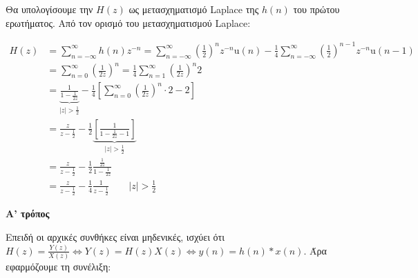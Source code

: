 \documentclass[11pt,a4paper,notitlepage,fleqn,draft]{article}
\begin{document}
\begin{exercise}
\begin{enumpar}
	\item
	

	Θα υπολογίσουμε την \( H(z) \) ως μετασχηματισμό Laplace της \( h(n) \) του πρώτου ερωτήματος.
	Από τον ορισμό του μετασχηματισμού Laplace:
	
	\begin{align*}
		H(z) &= \sum_{n=-\infty}^{\infty} h(n)z^{-n} = \sum_{n=-\infty}^{\infty}\left(\frac{1}{2}\right)^n z^{-n}\mathrm{u}(n)
		-\frac{1}{4}\sum_{n=-\infty}^{\infty}\left(\frac{1}{2}\right)^{n-1}z^{-n}\mathrm{u}(n-1)
		\\ &= \sum_{n=0}^{\infty} \left(\frac{1}{2z}\right)^n = \frac{1}{4}\sum_{n=1}^{\infty}\left(\frac{1}{2z}\right)^n 2
		\\ &= \underbrace{\frac{1}{1-\frac{1}{2z}}}_{|z|>\frac{1}{2}}
		- \frac{1}{4}\left[\sum_{n=0}^{\infty} \left(\frac{1}{2z}\right)^n \cdot 2 - 2 \right]
		\\ &= \frac{z}{z-\frac{1}{2}}-\frac{1}{2}\underbrace{\left[
		\frac{1}{1-\frac{1}{2z}-1}
		\right]}_{|z|>\frac{1}{2}}
        \\ &= \frac{z}{z-\frac{1}{2}} -\frac{1}{2}\frac{\frac{1}{2z}}{1-\frac{1}{2z}}
        \\ &
        =\frac{z}{z-\frac{1}{2}} - \frac{1}{4}\frac{1}{z-\frac{1}{2}}\qquad |z|>\frac{1}{2}
	\end{align*}
	
    \item
	\begin{enumgreekpar}
	\item \textbf{Α' τρόπος}
	
	
	Επειδή οι αρχικές συνθήκες είναι μηδενικές, ισχύει ότι \( H(z) = \frac{Y(z)}{X(z)}\iff
	Y(z) = H(z)X(z) \iff y(n) = h(n)*x(n) \). Άρα εφαρμόζουμε τη συνέλιξη:
	

\end{enumgreekpar}
\end{enumpar}
\end{exercise}
\end{document}
